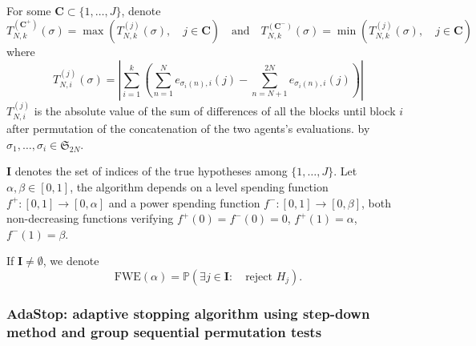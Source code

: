 \documentclass{article}
\theoremstyle{plain}
\theoremstyle{remark}
\renewcommand{\P}{\mathbb{P}}
\renewcommand{\S}{\mathfrak{S}}
\newcommand{\1}{\mathbbm{1}}
\numberwithin{equation}{section}
\begin{document}
For some $\textbf{C} \subset \{1,\dots,J\}$, denote
$$T_{N,k}^{(\textbf{C}^+)}(\sigma)= \max\left(T_{N,k}^{(j)}(\sigma),\quad j \in \textbf{C}\right) \quad \text{and}\quad T_{N,k}^{(\textbf{C}^-)}(\sigma)= \min\left(T_{N,k}^{(j)}(\sigma),\quad j \in \textbf{C}\right)$$
where 
$$T_{N,i}^{(j)}(\sigma)= \left|\sum_{i=1}^k\left(\sum_{n=1}^{N} e_{\sigma_i(n),i}(j)-\sum_{n=N+1}^{2N} e_{\sigma_i(n),i}(j)\right)\right|$$ 
$T_{N,i}^{(j)}$ is the absolute value of the sum of differences of all the blocks until block $i$ after permutation of the concatenation of the two agents's evaluations. by $\sigma_1,\dots,\sigma_i\in \S_{2N}$.
 
$\textbf{I}$ denotes the set of indices of the true hypotheses among $\{1,\dots,J\}$. Let $\alpha, \beta \in [0,1]$, the algorithm depends on a level spending function $f^+:[0,1]\to[0,\alpha]$ and a power spending function $f^-:[0,1]\to [0,\beta]$, both non-decreasing functions verifying $f^+(0)=f^-(0)=0$, $f^+(1)=\alpha$, $f^-(1)=\beta$. 

If $\textbf{I} \neq \emptyset$, we denote 
$$\mathrm{FWE}(\alpha) = \P\left(\exists j \in \textbf{I}:\quad  \text{reject }H_j \right).$$
\subsubsection{AdaStop: adaptive stopping algorithm using step-down method and group sequential permutation tests}
\end{document}
